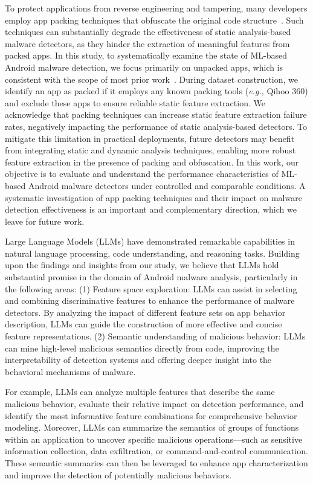 To protect applications from reverse engineering and tampering, many developers employ app packing techniques that obfuscate the original code structure~\cite{dong2022did,duan2018things}.
Such techniques can substantially degrade the effectiveness of static analysis-based malware detectors, as they hinder the extraction of meaningful features from packed apps.
In this study, to systematically examine the state of ML-based Android malware detection, we focus primarily on unpacked apps, which is consistent with the scope of most prior work~\cite{chen2023continuous,wu2021homdroid}.
During dataset construction, we identify an app as packed if it employs any known packing tools (\textit{e.g.,} Qihoo 360) and exclude these apps to ensure reliable static feature extraction.
We acknowledge that packing techniques can increase static feature extraction failure rates, negatively impacting the performance of static analysis-based detectors.
To mitigate this limitation in practical deployments, future detectors may benefit from integrating static and dynamic analysis techniques, enabling more robust feature extraction in the presence of packing and obfuscation.
In this work, our objective is to evaluate and understand the performance characteristics of ML-based Android malware detectors under controlled and comparable conditions.
A systematic investigation of app packing techniques and their impact on malware detection effectiveness is an important and complementary direction, which we leave for future work.

Large Language Models (LLMs) have demonstrated remarkable capabilities in natural language processing, code understanding, and reasoning tasks.
Building upon the findings and insights from our study, we believe that LLMs hold substantial promise in the domain of Android malware analysis, particularly in the following areas:
(1) Feature space exploration: LLMs can assist in selecting and combining discriminative features to enhance the performance of malware detectors.
By analyzing the impact of different feature sets on app behavior description, LLMs can guide the construction of more effective and concise feature representations.
(2) Semantic understanding of malicious behavior: LLMs can mine high-level malicious semantics directly from code, improving the interpretability of detection systems and offering deeper insight into the behavioral mechanisms of malware.

For example, LLMs can analyze multiple features that describe the same malicious behavior, evaluate their relative impact on detection performance, and identify the most informative feature combinations for comprehensive behavior modeling.
Moreover, LLMs can summarize the semantics of groups of functions within an application to uncover specific malicious operations—such as sensitive information collection, data exfiltration, or command-and-control communication.
These semantic summaries can then be leveraged to enhance app characterization and improve the detection of potentially malicious behaviors.

